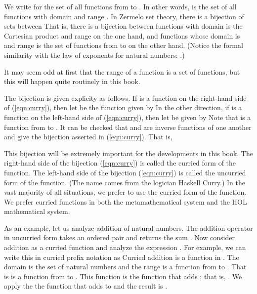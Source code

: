 We write  for the set of all functions from  to .  In other
words,  is the set of all functions with domain  and range .
In Zermelo set theory, there is a bijection of sets between
That is, there is a bijection between functions with domain is the Cartesian product  and range  on the one hand, and functions whose domain is  and range is the set of functions from  to  on the other hand.
(Notice the formal similarity with the law of exponents for natural numbers:
.)

It may seem odd at first that the range of a function is a set of functions, but this will happen quite routinely in this book.

The bijection is given explicity as follows.  If  is a function
on the right-hand side of (\ref{eqn:curry}), then let 
be the function given by 
In the other direction, if  is a function on the left-hand side of (\ref{eqn:curry}), then let  be given by
Note that  is a function from  to .
It can be  checked that  and  are inverse functions of one another and give the bijection asserted in (\ref{eqn:curry}).
That is,

This bijection will be extremely important for the developments in this book.  The right-hand side of the bijection (\ref{eqn:curry}) is called the curried form of the function.  The left-hand side of the bijection (\ref{eqn:curry}) is called the uncurried form of the function.  (The name comes from the logician Haskell Curry.)   In the vast majority of all situations, we prefer to use the curried form of the function.  We prefer curried functions in both the metamathematical system and the HOL mathematical system.

\begin{example}[addition]
As an example, let us analyze addition of natural numbers.  The addition operator in uncurried form takes an ordered pair  and
returns the sum .   Now consider addition as a curried function and analyze the expression .  For example, we can write this in curried prefix notation as
Curried addition is a function in .  The domain
is the set of natural numbers and the range is a function from  to .
That is  is a function from  to .  This function is the function that adds ; that is, .  We apply the
the function that adds  to  and the result is .
\end{example}

